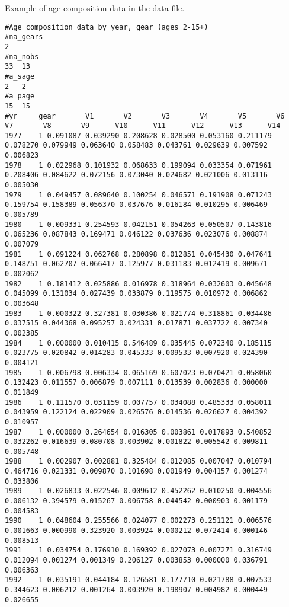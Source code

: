 \begin{landscape}
\begin{table}
\caption{Example of age composition data in the data file.}\label{T1}
\begin{scriptsize}
\begin{verbatim}
#Age composition data by year, gear (ages 2-15+)
#na_gears
2
#na_nobs
33	13
#a_sage
2	2
#a_page
15	15
#yr 	gear       V1       V2       V3       V4       V5       V6       V7       V8       V9      V10      V11      V12      V13      V14
1977    1 0.091087 0.039290 0.208628 0.028500 0.053160 0.211179 0.078270 0.079949 0.063640 0.058483 0.043761 0.029639 0.007592 0.006823
1978    1 0.022968 0.101932 0.068633 0.199094 0.033354 0.071961 0.208406 0.084622 0.072156 0.073040 0.024682 0.021006 0.013116 0.005030
1979    1 0.049457 0.089640 0.100254 0.046571 0.191908 0.071243 0.159754 0.158389 0.056370 0.037676 0.016184 0.010295 0.006469 0.005789
1980    1 0.009331 0.254593 0.042151 0.054263 0.050507 0.143816 0.065236 0.087843 0.169471 0.046122 0.037636 0.023076 0.008874 0.007079
1981    1 0.091224 0.062768 0.280898 0.012851 0.045430 0.047641 0.148751 0.062707 0.066417 0.125977 0.031183 0.012419 0.009671 0.002062
1982    1 0.181412 0.025886 0.016978 0.318964 0.032603 0.045648 0.045099 0.131034 0.027439 0.033879 0.119575 0.010972 0.006862 0.003648
1983    1 0.000322 0.327381 0.030386 0.021774 0.318861 0.034486 0.037515 0.044368 0.095257 0.024331 0.017871 0.037722 0.007340 0.002385
1984    1 0.000000 0.010415 0.546489 0.035445 0.072340 0.185115 0.023775 0.020842 0.014283 0.045333 0.009533 0.007920 0.024390 0.004121
1985    1 0.006798 0.006334 0.065169 0.607023 0.070421 0.058060 0.132423 0.011557 0.006879 0.007111 0.013539 0.002836 0.000000 0.011849
1986    1 0.111570 0.031159 0.007757 0.034088 0.485333 0.058011 0.043959 0.122124 0.022909 0.026576 0.014536 0.026627 0.004392 0.010957
1987    1 0.000000 0.264654 0.016305 0.003861 0.017893 0.540852 0.032262 0.016639 0.080708 0.003902 0.001822 0.005542 0.009811 0.005748
1988    1 0.002907 0.002881 0.325484 0.012085 0.007047 0.010794 0.464716 0.021331 0.009870 0.101698 0.001949 0.004157 0.001274 0.033806
1989    1 0.026833 0.022546 0.009612 0.452262 0.010250 0.004556 0.006132 0.394579 0.015267 0.006758 0.044542 0.000903 0.001179 0.004583
1990    1 0.048604 0.255566 0.024077 0.002273 0.251121 0.006576 0.001663 0.000990 0.323920 0.003924 0.000212 0.072414 0.000146 0.008513
1991    1 0.034754 0.176910 0.169392 0.027073 0.007271 0.316749 0.012094 0.001274 0.001349 0.206127 0.003853 0.000000 0.036791 0.006363
1992    1 0.035191 0.044184 0.126581 0.177710 0.021788 0.007533 0.344623 0.006212 0.001264 0.003920 0.198907 0.004982 0.000449 0.026655

\end{verbatim}
\end{scriptsize}
\end{table}
\end{landscape}
